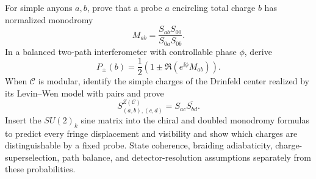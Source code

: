 \begin{exercise}
For simple anyons $a,b$, prove that a probe $a$ encircling total charge $b$
has normalized monodromy
\[
 M_{ab}=\frac{S_{ab}S_{00}}{S_{0a}S_{0b}}.
\]
In a balanced two-path interferometer with controllable phase $\phi$, derive
\[
 P_\pm(b)=\frac12\left(1\pm\Re(e^{\ii\phi}M_{ab})\right).
\]
When $\mathcal C$ is modular, identify the simple charges of the Drinfeld
center realized by its Levin--Wen model with pairs and prove
\[
 S^{Z(\mathcal C)}_{(a,b),(c,d)}
 =S_{ac}\overline{S_{bd}}.
\]
Insert the $SU(2)_k$ sine matrix into the chiral and doubled monodromy formulas
to predict every fringe displacement and visibility and show which charges
are distinguishable by a fixed probe.
State coherence, braiding adiabaticity, charge-superselection, path balance,
and detector-resolution assumptions separately from these probabilities.
\end{exercise}
